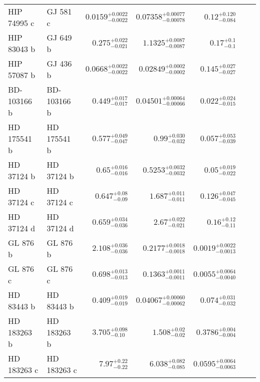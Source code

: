 \begin{longtable*}{llrrrrr}
HIP 74995 c & GJ 581 c & $0.0159^{+0.0022}_{-0.0022}$ & $0.07358^{+0.00077}_{-0.00078}$ & $0.12^{+0.120}_{-0.084}$ & \cite{Mayor09} & \\
HIP 83043 b & GJ 649 b & $0.275^{+0.022}_{-0.021}$ & $1.1325^{+0.0087}_{-0.0087}$ & $0.17^{+0.1}_{-0.1}$ & \cite{Johnson10} & \\
HIP 57087 b & GJ 436 b & $0.0668^{+0.0022}_{-0.0022}$ & $0.02849^{+0.0002}_{-0.0002}$ & $0.145^{+0.027}_{-0.027}$ & \cite{Butler04} & \\
BD-103166 b & BD-103166 b & $0.449^{+0.017}_{-0.017}$ & $0.04501^{+0.00064}_{-0.00066}$ & $0.022^{+0.024}_{-0.015}$ & \cite{Butler00} & \\
HD 175541 b & HD 175541 b & $0.577^{+0.049}_{-0.047}$ & $0.99^{+0.030}_{-0.032}$ & $0.057^{+0.053}_{-0.039}$ & \cite{Johnson07} & \\
HD 37124 b & HD 37124 b & $0.65^{+0.016}_{-0.016}$ & $0.5253^{+0.0032}_{-0.0032}$ & $0.05^{+0.019}_{-0.022}$ & \cite{Butler03} & \\
HD 37124 c & HD 37124 c & $0.647^{+0.08}_{-0.09}$ & $1.687^{+0.011}_{-0.011}$ & $0.126^{+0.047}_{-0.045}$ & \cite{Butler03} & \\
HD 37124 d & HD 37124 d & $0.659^{+0.034}_{-0.036}$ & $2.67^{+0.022}_{-0.021}$ & $0.16^{+0.12}_{-0.11}$ & \cite{Vogt05} & \\
GL 876 b & GL 876 b & $2.108^{+0.036}_{-0.036}$ & $0.2177^{+0.0018}_{-0.0018}$ & $0.0019^{+0.0022}_{-0.0013}$ & \cite{Marcy01} & \\
GL 876 c & GL 876 c & $0.698^{+0.013}_{-0.013}$ & $0.1363^{+0.0011}_{-0.0011}$ & $0.0055^{+0.0064}_{-0.0040}$ & \cite{Marcy01} & \\
HD 83443 b & HD 83443 b & $0.409^{+0.019}_{-0.019}$ & $0.04067^{+0.00060}_{-0.00062}$ & $0.074^{+0.031}_{-0.032}$ & \cite{Butler02} & \\
HD 183263 b & HD 183263 b & $3.705^{+0.098}_{-0.10}$ & $1.508^{+0.02}_{-0.02}$ & $0.3786^{+0.004}_{-0.004}$ & \cite{Marcy05} & \\
HD 183263 c & HD 183263 c & $7.97^{+0.22}_{-0.22}$ & $6.038^{+0.082}_{-0.085}$ & $0.0595^{+0.0064}_{-0.0063}$ & \cite{Wright09} & \\
\bottomrule
\end{longtable*}
